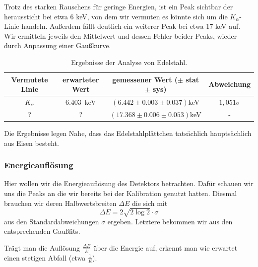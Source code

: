 \documentclass[a4paper,14pt]{article}
\begin{document}
Trotz des starken Rauschens für geringe Energien, ist ein Peak sichtbar der heraussticht bei etwa 6 keV, von dem wir vermuten es könnte sich um die $K_\alpha$-Linie handeln. Außerdem fällt deutlich ein weiterer Peak bei etwa 17 keV auf. Wir ermitteln jeweils den Mittelwert und dessen Fehler beider Peaks, wieder durch Anpassung einer Gaußkurve.

\begin{table}[H]
	\renewcommand{\arraystretch}{1.5}
	\centering
	\begin{tabular}{|c|c|c|c|}
		\hline
		Vermutete Linie & erwarteter Wert & gemessener Wert ($\pm$ stat $\pm$ sys) & Abweichung \\
		\hline
		$K_\alpha$ & \SI{6.403}{keV} & $(6.442 \pm 0.003 \pm 0.037)$keV & $1,051\sigma$ \\
		\cline{1-4}
		 ? & ? & $(17.368 \pm 0.006 \pm 0.053)$keV & - \\
		\hline
	\end{tabular}
	\caption{Ergebnisse der Analyse von Edelstahl.}
	\label{tab:am_fe_mean}
\end{table}

Die Ergebnisse legen Nahe, dass das Edelstahlplättchen tatsächlich hauptsächlich aus Eisen besteht.

\subsubsection{Energieauflösung}
Hier wollen wir die Energieauflösung des Detektors betrachten. Dafür schauen wir uns die Peaks an die wir bereits bei der Kalibration genutzt hatten. Diesmal brauchen wir deren Halbwertsbreiten $\Delta E$ die sich mit
\begin{equation}
	\Delta E = 2 \sqrt{2 \log2} \cdot \sigma
\end{equation}
aus den Standardabweichungen $\sigma$ ergeben. Letztere bekommen wir aus den entsprechenden Gaußfits.

Trägt man die Auflösung $\frac{\Delta E}{E}$ über die Energie auf, erkennt man wie erwartet einen stetigen Abfall (etwa $\frac{1}{E}$).
\end{document}
